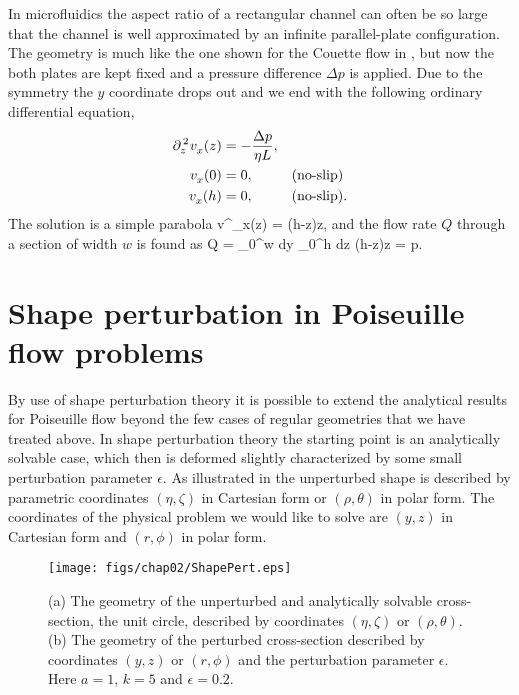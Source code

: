 In microfluidics the aspect ratio of a rectangular channel can
often be so large that the channel is well approximated by an
infinite parallel-plate configuration. The geometry is much like
the one shown for the Couette flow in , but
now the both plates are kept fixed and a pressure difference
$\Delta p$ is applied. Due to the symmetry the $y$ coordinate
drops out and we end with the following ordinary differential
equation,
%
 \bsub
 \begin{alignat}{2}
 \eqlab{InfPlateNSx}
 \ppsqr_z v^{{}}_x(z) &= -\frac{\Delta p}{\eta L}, &&\\
 v^{{}}_x(0) &= 0, & & \textrm{(no-slip)}\\
 v^{{}}_x(h) &= 0, & & \textrm{(no-slip).}
 \end{alignat}
 \esub
%
The solution is a simple parabola
%
 v^{{}}_x(z) = \: (h-z)z,
 \eeq
%
and the flow rate $Q$ through a section of width $w$ is found as
%
 Q = \int_0^w dy \int_0^h dz\: \: (h-z)z
 = \: \Delta p.
 \eeq
%

\section{Shape perturbation in Poiseuille flow problems}

By use of shape perturbation theory it is possible to extend the
analytical results for Poiseuille flow beyond the few cases of
regular geometries that we have treated above. In shape
perturbation theory the starting point is an analytically solvable
case, which then is deformed slightly characterized by some small
perturbation parameter $\epsilon$. As illustrated in
 the unperturbed shape is described by
parametric coordinates $(\eta,\zeta)$ in Cartesian form or
$(\rho,\theta)$ in polar form. The coordinates of the physical
problem we would like to solve are $(y,z)$ in Cartesian form and
$(r,\phi)$ in polar form.


\begin{figure}
\centerline{
  \texttt{[image: figs/chap02/ShapePert.eps]}}
\caption[Shape perturbation of circular
channel]{ (a) The geometry of the unperturbed
and analytically solvable cross-section, the unit circle,
described by coordinates $(\eta,\zeta)$ or $(\rho,\theta)$. (b)
The geometry of the perturbed cross-section described by
coordinates $(y,z)$ or $(r,\phi)$ and the perturbation parameter
$\epsilon$. Here $a=1$, $k=5$ and $\epsilon=0.2$.}
\end{figure}

